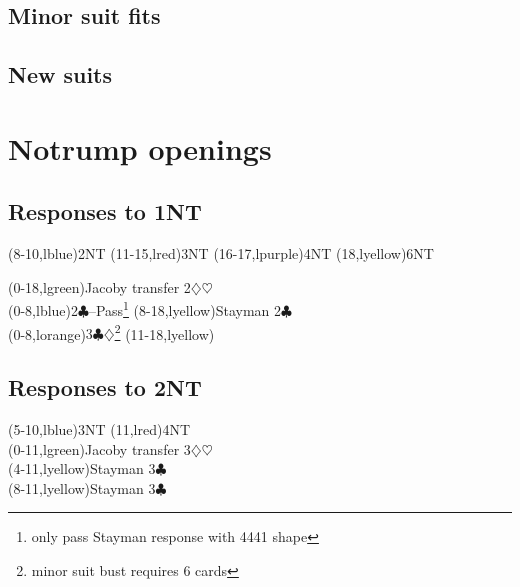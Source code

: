 \documentclass[oneside]{memoir}
\def\C{$\clubsuit$}
\def\D{$\diamondsuit$}
\def\H{$\heartsuit$}
\begin{document}
\section{Minor suit fits}


\section{New suits}


\chapter{Notrump openings}

\section{Responses to 1NT}
\begin{ptable}
  \bid(8-10,lblue){2NT}
  \bid(11-15,lred){3NT}
  \bid(16-17,lpurple){4NT}
  \bid(18,lyellow){6NT}\\
\iffalse %
  \bid(0-10,lgreen){Jacoby transfer 2\D\H}
  \bid(11-15,lblue){Texas transfer 4\D\H}
  \bid(16-18,lgreen){2\D\H}\\
\else
  \bid(0-18,lgreen){Jacoby transfer 2\D\H}\\
\fi
{}
  \bid(0-8,lblue){2\C--Pass\footnote{only pass Stayman response with 4441 shape}}
  \bid*(8-18,lyellow){Stayman 2\C}\\
  \bid(0-8,lorange){3\C\D\footnote{minor suit bust requires 6 cards}}
  \bid(11-18,lyellow){\cdrop[-.45pc]{Stayman 2\C}}\\
\end{ptable}

\section{Responses to 2NT}
\begin{ptable}
  \bid(5-10,lblue){3NT}
  \bid(11,lred){4NT}\\
  \bid(0-11,lgreen){Jacoby transfer 3\D\H}\\
  \bid(4-11,lyellow){Stayman 3\C}\\
  \bid*(8-11,lyellow){Stayman 3\C}\\
\end{ptable}
\end{document}
